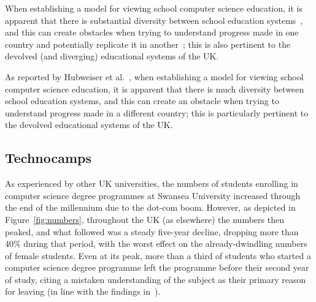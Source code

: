 When establishing a model for viewing school computer science
education, it is apparent that there is substantial diversity between
school education systems~\cite{snyder:2012}, and this can create
obstacles when trying to understand progress made in one country and
potentially replicate it in another~\cite{hubwieser-et-al:2015}; this
is also pertinent to the devolved (and diverging) educational systems
of the UK.

As reported by Hubweiser et al.~\cite{hubwieser-et-al:2011}, when
establishing a model for viewing school computer science education, it
is apparent that there is much diversity between school education
systems, and this can create an obstacle when trying to understand
progress made in a different country; this is particularly pertinent
to the devolved educational systems of the UK.

\subsection{Technocamps}\label{technocamps}

As experienced by other UK universities, the numbers of students
enrolling in computer science degree programmes at Swansea University
increased through the end of the millennium due to the dot-com boom.
However, as depicted in Figure~\ref{fig:numbers}, throughout the UK
(as elsewhere) the numbers then peaked, and what followed was a steady
five-year decline, dropping more than 40\% during that period, with
the worst effect on the already-dwindling numbers of female students.
Even at its peak, more than a third of students who started a computer
science degree programme left the programme before their second year
of study, citing a mistaken understanding of the subject as their
primary reason for leaving
(in line with the findings in~\cite{brown-et-al-toce2014}).

